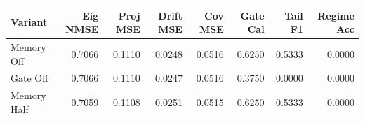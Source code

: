 \begin{tabular}{lrrrrrrr}
\toprule
Variant & Eig NMSE & Proj MSE & Drift MSE & Cov MSE & Gate Cal & Tail F1 & Regime Acc \\
\midrule
Memory Off & 0.7066 & 0.1110 & 0.0248 & 0.0516 & 0.6250 & 0.5333 & 0.0000 \\
Gate Off & 0.7066 & 0.1110 & 0.0247 & 0.0516 & 0.3750 & 0.0000 & 0.0000 \\
Memory Half & 0.7059 & 0.1108 & 0.0251 & 0.0515 & 0.6250 & 0.5333 & 0.0000 \\
\bottomrule
\end{tabular}